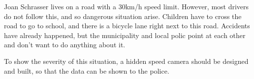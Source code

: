 Joan Schrasser lives on a road with a 30km/h speed limit. However, most drivers do not follow this, and so dangerous situation arise.
Children have to cross the road to go to school, and there is a bicycle lane right next to this road.
Accidents have already happened, but the municipality and local polic point at each other and don't want to do anything about it.
\cite{avans:assignment}

To show the severity of this situation, a hidden speed camera should be designed and built, so that the data can be shown to the police.
